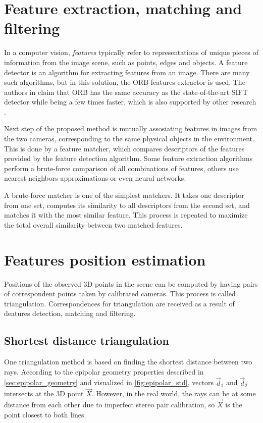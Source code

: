 \section{Feature extraction, matching and filtering}
\label{sec:features}
In a computer vision, \textit{features} typically refer to representations of unique pieces of information from the image scene, such as points, edges and objects.
A feature detector is an algorithm for extracting features from an image.
There are many such algorithms, but in this solution, the ORB features extractor is used. 
The authors in \cite{Rublee2011} claim that ORB has the same accuracy as the state-of-the-art SIFT detector while being a few times faster, which is also supported by other research \cite{Sharif2017}. 

Next step of the proposed method is mutually assosiating features in images from the two cameras, corresponding to the same physical objects in the environment. 
This is done by a feature matcher, which compares descriptors of the features provided by the feature detection algorithm.
Some feature extraction algorithms perform a brute-force comparison of all combinations of features, others use nearest neighbors approximations or even neural networks.

A brute-force matcher is one of the simplest matchers.
It takes one descriptor from one set, computes its similarity to all descriptors from the second set, and matches it with the most similar feature. 
This process is repeated to maximize the total overall similarity between two matched features.

\section{Features position estimation}
Positions of the observed 3D points in the scene can be computed by having pairs of correspondent points taken by calibrated cameras.
This process is called triangulation.
Correspondences for triangulation are received as a result of deatures detection, matching and filtering.

\subsection{Shortest distance triangulation}
\label{sec:shortest_distance}
One triangulation method is based on finding the shortest distance between two rays.
According to the epipolar geometry properties described in \autoref{sec:epipolar_geometry} and visualized in \autoref{fig:epipolar_std}, vectors $\vec{d}_1$ and $\vec{d}_2$ intersects at the 3D point $\vec{X}$.
However, in the real world, the rays can be at some distance from each other due to imperfect stereo pair calibration, so $\vec{X}$ is the point closest to both lines.

